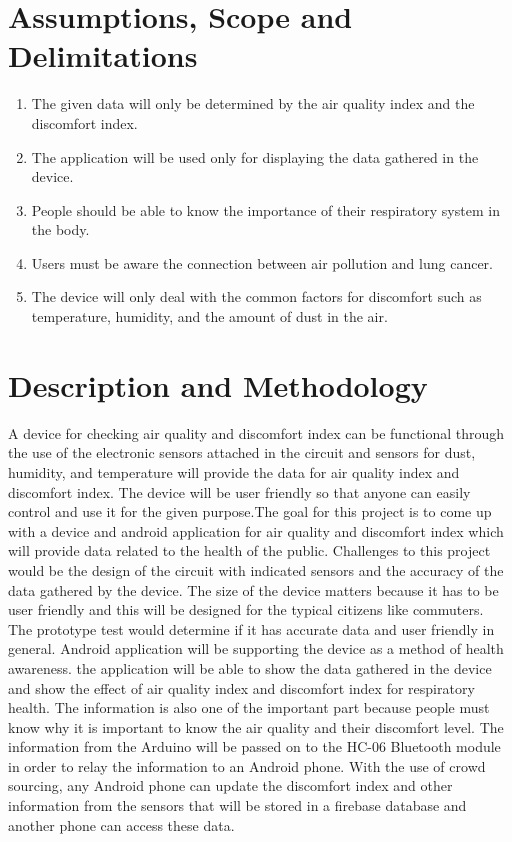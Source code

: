 \section{Assumptions, Scope and Delimitations}

\begin{enumerate}
\item The given data will only be determined by the air quality index and the discomfort index.

\item The application will be used only for displaying the data gathered in the device.

\item People should be able to know the importance of their respiratory system in the body.

\item Users must be aware the connection between air pollution and lung cancer.

\item The device will only deal with the common factors for discomfort such as temperature, humidity, and the amount of dust in the air.

\end{enumerate}

\section{Description and Methodology}

A device for checking air quality and discomfort index can be functional through the use of the electronic sensors attached in the circuit and sensors for dust, humidity, and temperature will provide the data for air quality index and discomfort index. The device will be user friendly so that anyone can easily control and use it for the given purpose.The goal for this project is to come up with a device and android application for air quality and discomfort index which will provide data related to the health of the public.  Challenges to this project would be the design of the circuit with indicated sensors and the accuracy of the data gathered by the device. The size of the device matters because it has to be user friendly and this will be designed for the typical citizens like commuters. The prototype test  would determine if it has accurate data and user friendly in general. Android application will be supporting the device as a method of health awareness. the application will be able to show the data gathered in the device and show the effect of air quality index and discomfort index for respiratory health. The information is also one of the important part because people must know why it is important to know the air quality and their discomfort level. The information from the Arduino will be passed on to the HC-06 Bluetooth module in order to relay the information to an Android phone.  With the use of crowd sourcing, any Android phone can update the discomfort index and other information from the sensors that will be stored in a firebase database and another phone can access these data.  



